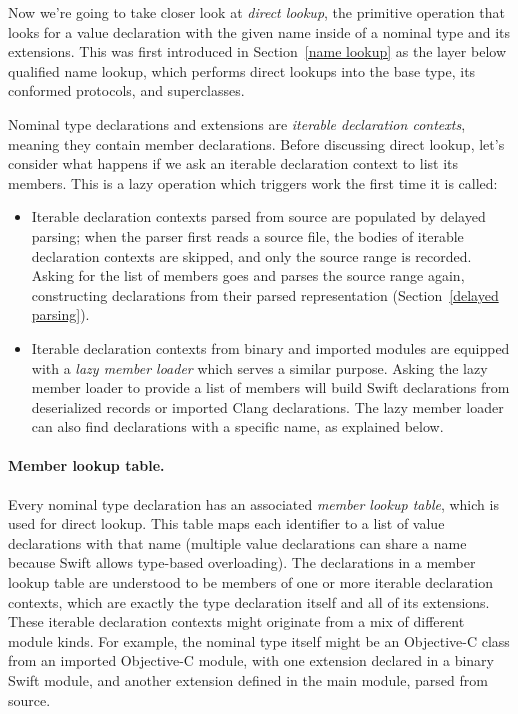 \documentclass[../generics]{subfiles}
\begin{document}
Now we're going to take closer look at \emph{direct lookup}, the primitive operation that looks for a value declaration with the given name inside of a nominal type and its extensions. This was first introduced in Section~\ref{name lookup} as the layer below qualified name lookup, which performs direct lookups into the base type, its conformed protocols, and superclasses.

Nominal type declarations and extensions are \emph{iterable declaration contexts}, meaning they contain member declarations. Before discussing direct lookup, let's consider what happens if we ask an iterable declaration context to list its members. This is a lazy operation which triggers work the first time it is called:
\begin{itemize}
\item Iterable declaration contexts parsed from source are populated by delayed parsing; when the parser first reads a source file, the bodies of iterable declaration contexts are skipped, and only the source range is recorded. Asking for the list of members goes and parses the source range again, constructing declarations from their parsed representation (Section~\ref{delayed parsing}).
\item Iterable declaration contexts from binary and imported modules are equipped with a \emph{lazy member loader} which serves a similar purpose. Asking the lazy member loader to provide a list of members will build Swift declarations from deserialized records or imported Clang declarations. The lazy member loader can also find declarations with a specific name, as explained below.
\end{itemize}

\paragraph{Member lookup table.}
Every nominal type declaration has an associated \emph{member lookup table}, which is used for direct lookup. This table maps each identifier to a list of value declarations with that name (multiple value declarations can share a name because Swift allows type-based overloading). The declarations in a member lookup table are understood to be members of one or more iterable declaration contexts, which are exactly the type declaration itself and all of its extensions. These iterable declaration contexts might originate from a mix of different module kinds. For example, the nominal type itself might be an Objective-C class from an imported Objective-C module, with one extension declared in a binary Swift module, and another extension defined in the main module, parsed from source. 
\end{document}
